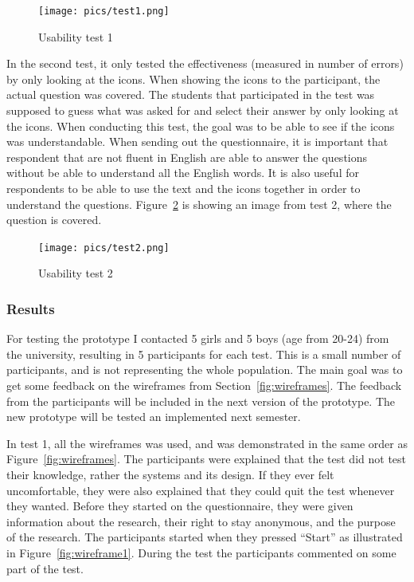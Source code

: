     \begin{figure}[H]
      \centering
      \texttt{[image: pics/test1.png]}
      \caption{Usability test 1}
      \label{fig:test1}
    \end{figure}

  In the second test, it only tested the effectiveness (measured in number of errors) by only looking at the icons. When showing the icons to the participant, the actual question was covered. The students that participated in the test was supposed to guess what was asked for and select their answer by only looking at the icons. When conducting this test, the goal was to be able to see if the icons was understandable. When sending out the questionnaire, it is important that respondent that are not fluent in English are able to answer the questions without be able to understand all the English words. It is also useful for respondents to be able to use the text and the icons together in order to understand the questions. Figure~\ref{fig:test2} is showing an image from test 2, where the question is covered. 

    \begin{figure}[H]
      \centering
      \texttt{[image: pics/test2.png]}
      \caption{Usability test 2}
      \label{fig:test2}
    \end{figure}

  \subsubsection*{Results}

  For testing the prototype I contacted 5 girls and 5 boys (age from 20-24) from the university, resulting in 5 participants for each test. This is a small number of participants, and is not representing the whole population. The main goal was to get some feedback on the wireframes from Section~\ref{fig:wireframes}. The feedback from the participants will be included in the next version of the prototype. The new prototype will be tested an implemented next semester. 

  In test 1, all the wireframes was used, and was demonstrated in the same order as Figure~\ref{fig:wireframes}. The participants were explained that the test did not test their knowledge, rather the systems and its design. If they ever felt uncomfortable, they were also explained that they could quit the test whenever they wanted. Before they started on the questionnaire, they were given information about the research, their right to stay anonymous, and the purpose of the research. The participants started when they pressed ``Start'' as illustrated in Figure~\ref{fig:wireframe1}. During the test the participants commented on some part of the test.

